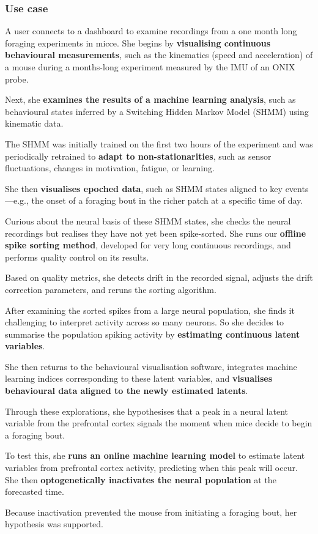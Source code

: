 \subsubsection{Use case}

A user connects to a dashboard to examine recordings from a one month long
foraging experiments in micce. She begins by \textbf{visualising continuous
behavioural measurements}, such as the kinematics (speed and acceleration) of a
mouse during a months-long experiment measured by the IMU of an ONIX probe.

Next, she \textbf{examines the results of a machine learning analysis},
such as behavioural states inferred by a Switching Hidden Markov Model (SHMM)
using kinematic data.

The SHMM was initially trained on the first two hours of the experiment
and was periodically retrained to \textbf{adapt to non-stationarities},
such as sensor fluctuations, changes in motivation, fatigue, or learning.

She then \textbf{visualises epoched data}, such as SHMM states aligned to
key events—e.g., the onset of a foraging bout in the richer patch at a
specific time of day.

Curious about the neural basis of these SHMM states, she checks the neural
recordings but realises they have not yet been spike-sorted. She runs our
\textbf{offline spike sorting method}, developed for very long continuous
recordings, and performs quality control on its results.

Based on quality metrics, she detects drift in the recorded signal,
adjusts the drift correction parameters, and reruns the sorting algorithm.

		After examining the sorted spikes from a large neural population,  she
finds it challenging to interpret activity across so many neurons.  So she
decides to summarise the population spiking activity by \textbf{estimating
continuous latent variables}.

She then returns to the behavioural visualisation software, integrates
machine learning indices corresponding to these latent variables, and
\textbf{visualises behavioural data aligned to the newly estimated latents}.

Through these explorations, she hypothesises that a peak in a neural latent
variable from the prefrontal cortex signals the moment when mice decide
to begin a foraging bout.

To test this, she \textbf{runs an online machine learning model} to estimate
latent variables from prefrontal cortex activity, predicting when this
peak will occur. She then \textbf{optogenetically inactivates the neural
population} at the forecasted time.

Because inactivation prevented the mouse from initiating a foraging bout,
her hypothesis was supported.

